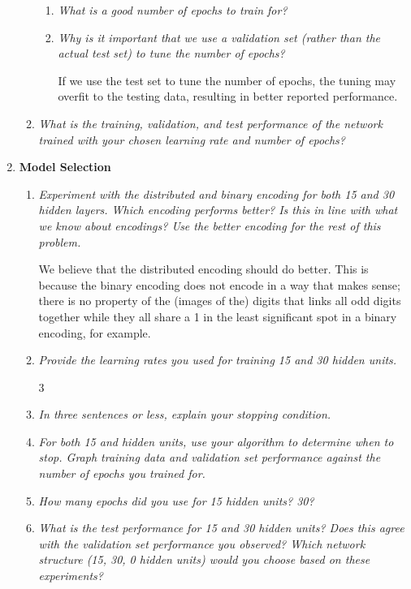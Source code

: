 \documentclass{article}
\begin{document}
\begin{enumerate}
\begin{enumerate}
\begin{enumerate}
      \item \textit{What is a good number of epochs to train for?}


      \item \textit{Why is it important that we use a validation set
        (rather than the actual test set) to tune the number of
        epochs?}

        If we use the test set to tune the number of epochs, the tuning may 
        overfit to the testing data, resulting in better reported performance. 

      \end{enumerate}
    \item \textit{What is the training, validation, and test
      performance of the network trained with your chosen learning
      rate and number of epochs?}

    \end{enumerate}

  \item \textbf{Model Selection}
    \begin{enumerate}
    \item \textit{Experiment with the distributed and binary encoding
      for both 15 and 30 hidden layers. Which encoding performs
      better? Is this in line with what we know about encodings? Use
      the better encoding for the rest of this problem.}


      We believe that the distributed encoding should do better. 
      This is because the binary encoding does not encode in a way
      that makes sense; there is no property of the (images of the)
      digits that links all odd digits together while they all share
      a 1 in the least significant spot in a binary encoding, for 
      example. 


    \item \textit{Provide the learning rates you used for training 15
      and 30 hidden units.}

      \setcounter{enumii}3

    \item \textit{In three sentences or less, explain your stopping
      condition.}

    \item \textit{For both 15 and hidden units, use your algorithm to
      determine when to stop.  Graph training data and validation set
      performance against the number of epochs you trained for.}

    \item \textit{How many epochs did you use for 15 hidden units?
      30?}

    \item \textit{What is the test performance for 15 and 30 hidden
      units? Does this agree with the validation set performance you
      observed? Which network structure (15, 30, 0 hidden units) would
      you choose based on these experiments?}

    \end{enumerate}


  \end{enumerate}
\end{document}
